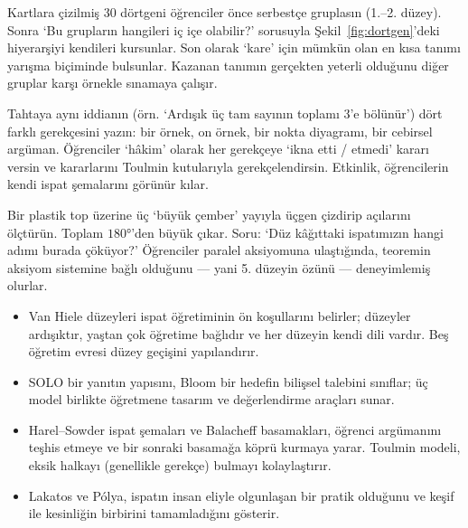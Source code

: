 \begin{sinif}
Kartlara çizilmiş 30 dörtgeni öğrenciler önce serbestçe gruplasın (1.–2. düzey). Sonra ‘Bu grupların hangileri iç içe olabilir?’ sorusuyla Şekil~\ref{fig:dortgen}’deki hiyerarşiyi kendileri kursunlar. Son olarak ‘kare’ için mümkün olan en kısa tanımı yarışma biçiminde bulsunlar. Kazanan tanımın gerçekten yeterli olduğunu diğer gruplar karşı örnekle sınamaya çalışır.
\end{sinif}

\begin{sinif}
Tahtaya aynı iddianın (örn. ‘Ardışık üç tam sayının toplamı 3’e bölünür’) dört farklı gerekçesini yazın: bir örnek, on örnek, bir nokta diyagramı, bir cebirsel argüman. Öğrenciler ‘hâkim’ olarak her gerekçeye ‘ikna etti / etmedi’ kararı versin ve kararlarını Toulmin kutularıyla gerekçelendirsin. Etkinlik, öğrencilerin kendi ispat şemalarını görünür kılar.
\end{sinif}

\begin{sinif}
Bir plastik top üzerine üç ‘büyük çember’ yayıyla üçgen çizdirip açılarını ölçtürün. Toplam $180°$’den büyük çıkar. Soru: ‘Düz kâğıttaki ispatımızın hangi adımı burada çöküyor?’ Öğrenciler paralel aksiyomuna ulaştığında, teoremin aksiyom sistemine bağlı olduğunu — yani 5. düzeyin özünü — deneyimlemiş olurlar.
\end{sinif}


\begin{itemize}[leftmargin=1.4em]
\item Van Hiele düzeyleri ispat öğretiminin ön koşullarını belirler; düzeyler ardışıktır, yaştan çok öğretime bağlıdır ve her düzeyin kendi dili vardır. Beş öğretim evresi düzey geçişini yapılandırır.
\item SOLO bir yanıtın yapısını, Bloom bir hedefin bilişsel talebini sınıflar; üç model birlikte öğretmene tasarım ve değerlendirme araçları sunar.
\item Harel–Sowder ispat şemaları ve Balacheff basamakları, öğrenci argümanını teşhis etmeye ve bir sonraki basamağa köprü kurmaya yarar. Toulmin modeli, eksik halkayı (genellikle gerekçe) bulmayı kolaylaştırır.
\item Lakatos ve Pólya, ispatın insan eliyle olgunlaşan bir pratik olduğunu ve keşif ile kesinliğin birbirini tamamladığını gösterir.
\end{itemize}

